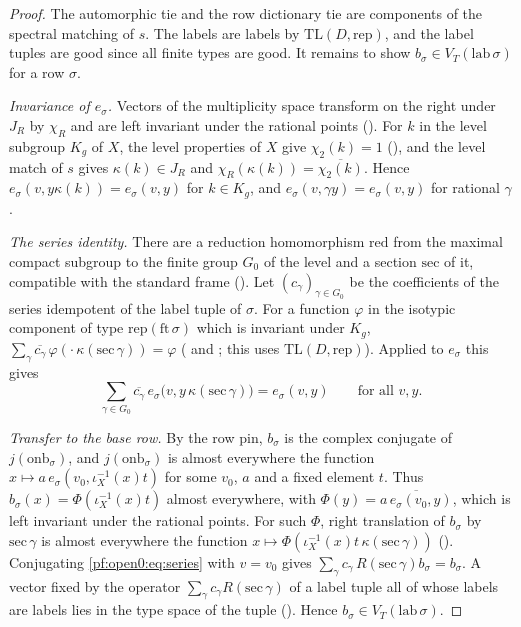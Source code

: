 \begin{proof}
The automorphic tie and the row dictionary tie are components of the spectral matching of $s$. The labels are labels by
$\mathrm{TL}(D,\mathrm{rep})$, and the label tuples are good since all finite types are good. It remains to show
$b_\sigma\in V_T(\mathrm{lab}\,\sigma)$ for a row $\sigma$.

\emph{Invariance of $e_\sigma$.} Vectors of the multiplicity space transform on the right under $J_R$ by $\chi_R$ and are left
invariant under the rational points (). For $k$ in the level subgroup $K_g$ of $X$,
the level properties of $X$ give $\chi_2(k)=1$ (), and the level match of $s$
gives $\kappa(k)\in J_R$ and $\chi_R(\kappa(k))=\overline{\chi_2(k)}$. Hence $e_\sigma(v,y\kappa(k))=e_\sigma(v,y)$
for $k\in K_g$, and $e_\sigma(v,\gamma y)=e_\sigma(v,y)$ for rational $\gamma$.

\emph{The series identity.} There are a reduction homomorphism $\mathrm{red}$ from the maximal compact subgroup to the finite group
$G_0$ of the level and a section $\mathrm{sec}$ of it, compatible with the standard frame
(). Let $(c_\gamma)_{\gamma\in G_0}$ be the coefficients of
the series idempotent of the label tuple of $\sigma$. For a function $\varphi$ in the isotypic component of type
$\mathrm{rep}(\mathrm{ft}\,\sigma)$ which is invariant under $K_g$,
$\sum_\gamma\overline{c_\gamma}\,\varphi(\cdot\,\kappa(\mathrm{sec}\,\gamma))=\varphi$
( and ;
this uses $\mathrm{TL}(D,\mathrm{rep})$). Applied to $e_\sigma$ this gives
\begin{equation}\label{pf:open0:eq:series}
\sum_{\gamma\in G_0}\overline{c_\gamma}\,e_\sigma\bigl(v,y\,\kappa(\mathrm{sec}\,\gamma)\bigr)=e_\sigma(v,y)\qquad\text{for all }v,y.
\end{equation}

\emph{Transfer to the base row.} By the row pin, $b_\sigma$ is the complex conjugate of $j(\mathrm{onb}_\sigma)$, and $j(\mathrm{onb}_\sigma)$
is almost everywhere the function $x\mapsto a\,e_\sigma(v_0,\iota_X^{-1}(x)t)$ for some $v_0$, $a$ and a fixed element $t$. Thus
$b_\sigma(x)=\Phi(\iota_X^{-1}(x)t)$ almost everywhere, with $\Phi(y)=\overline{a\,e_\sigma(v_0,y)}$, which is left invariant under the
rational points. For such $\Phi$, right translation of $b_\sigma$ by $\mathrm{sec}\,\gamma$ is almost everywhere the function
$x\mapsto\Phi(\iota_X^{-1}(x)t\,\kappa(\mathrm{sec}\,\gamma))$ (). Conjugating
\eqref{pf:open0:eq:series} with $v=v_0$ gives $\sum_\gamma c_\gamma\,R(\mathrm{sec}\,\gamma)b_\sigma=b_\sigma$. A vector fixed by the operator
$\sum_\gamma c_\gamma R(\mathrm{sec}\,\gamma)$ of a label tuple all of whose labels are labels lies in the type space of the tuple
(). Hence $b_\sigma\in V_T(\mathrm{lab}\,\sigma)$.
\end{proof}

